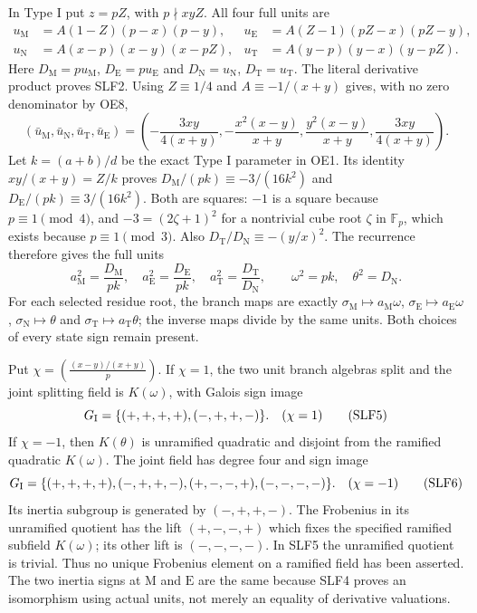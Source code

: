 In Type I put $z=pZ$, with $p\nmid xyZ$. All four full units are
\[
\begin{aligned}
 u_{\mathrm M}&=A(1-Z)(p-x)(p-y),&
 u_{\mathrm E}&=A(Z-1)(pZ-x)(pZ-y),\\
 u_{\mathrm N}&=A(x-p)(x-y)(x-pZ),&
 u_{\mathrm T}&=A(y-p)(y-x)(y-pZ).
\end{aligned}                                                   \tag{SLF2}
\]
Here $D_{\mathrm M}=pu_{\mathrm M}$,
$D_{\mathrm E}=pu_{\mathrm E}$ and
$D_{\mathrm N}=u_{\mathrm N}$, $D_{\mathrm T}=u_{\mathrm T}$.
The literal derivative product proves SLF2. Using $Z\equiv1/4$
and $A\equiv-1/(x+y)$ gives, with no zero denominator by OE8,
\[
 (\bar u_{\mathrm M},\bar u_{\mathrm N},
   \bar u_{\mathrm T},\bar u_{\mathrm E})
 =\left(-\frac{3xy}{4(x+y)},
 -\frac{x^2(x-y)}{x+y},\frac{y^2(x-y)}{x+y},
 \frac{3xy}{4(x+y)}\right).                            \tag{SLF3}
\]
Let $k=(a+b)/d$ be the exact Type I parameter in OE1. Its identity
$xy/(x+y)=Z/k$ proves
$D_{\mathrm M}/(pk)\equiv-3/(16k^2)$ and
$D_{\mathrm E}/(pk)\equiv3/(16k^2)$.
Both are squares: $-1$ is a square because $p\equiv1\pmod4$,
and $-3=(2\zeta+1)^2$ for a nontrivial cube root $\zeta$ in
$\mathbb F_p$, which exists because $p\equiv1\pmod3$.
Also $D_{\mathrm T}/D_{\mathrm N}\equiv-(y/x)^2$.
The recurrence therefore gives the full units
\[
 a_{\mathrm M}^2=\frac{D_{\mathrm M}}{pk},\quad
 a_{\mathrm E}^2=\frac{D_{\mathrm E}}{pk},\quad
 a_{\mathrm T}^2=\frac{D_{\mathrm T}}{D_{\mathrm N}},\qquad
 \omega^2=pk,\quad\theta^2=D_{\mathrm N}.              \tag{SLF4}
\]
For each selected residue root, the branch maps are exactly
$\sigma_{\mathrm M}\mapsto a_{\mathrm M}\omega$,
$\sigma_{\mathrm E}\mapsto a_{\mathrm E}\omega$,
$\sigma_{\mathrm N}\mapsto\theta$ and
$\sigma_{\mathrm T}\mapsto a_{\mathrm T}\theta$;
the inverse maps divide by the same units. Both choices of every
state sign remain present.

Put $\chi=\left(\frac{(x-y)/(x+y)}p\right)$. If $\chi=1$,
the two unit branch algebras split and the joint splitting field
is $K(\omega)$, with Galois sign image
\[
 G_{\rm I}=\{(+,+,+,+),(-,+,+,-)\}.
 \quad (\chi=1)                                       \tag{SLF5}
\]
If $\chi=-1$, then $K(\theta)$ is unramified quadratic and disjoint
from the ramified quadratic $K(\omega)$. The joint field has degree
four and sign image
\[
 G_{\rm I}=\{(+,+,+,+),(-,+,+,-),(+,-,-,+),(-,-,-,-)\}.
 \quad (\chi=-1)                                      \tag{SLF6}
\]
Its inertia subgroup is generated by $(-,+,+,-)$.
The Frobenius in its unramified quotient has the lift $(+,-,-,+)$
which fixes the specified ramified subfield $K(\omega)$; its other
lift is $(-,-,-,-)$. In SLF5 the unramified quotient is trivial.
Thus no unique Frobenius element on a ramified field has been
asserted. The two inertia signs at $\mathrm M$ and $\mathrm E$ are
the same because SLF4 proves an isomorphism using actual units,
not merely an equality of derivative valuations.

